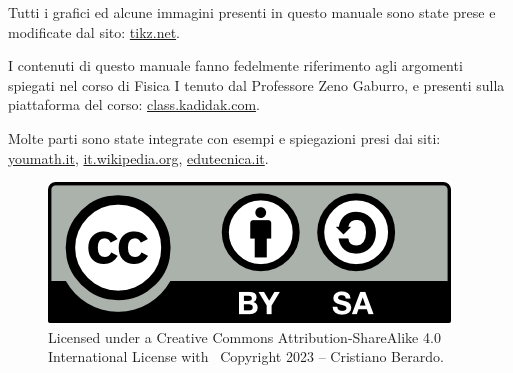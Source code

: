 \begin{thebibliography}{9}

Tutti i grafici ed alcune immagini presenti in questo manuale sono state prese e modificate dal sito: \href{https://tikz.net/}{tikz.net}.

I contenuti di questo manuale fanno fedelmente riferimento agli argomenti spiegati nel corso di Fisica I tenuto dal Professore Zeno Gaburro, e presenti sulla piattaforma del corso: \href{https://class.kadidak.com/}{class.kadidak.com}.

Molte parti sono state integrate con esempi e spiegazioni presi dai siti: \href{https://www.youmath.it/}{youmath.it}, \href{https://it.wikipedia.org/}{it.wikipedia.org}, \href{https://www.edutecnica.it/}{edutecnica.it}.


\begin{figure}[b]
    \centering
    \includegraphics[scale = 0.5]{image/by-sa.png}
    \captionsetup{labelformat=empty}
    \captionsetup{justification=centering}
    \caption{Licensed under a Creative Commons Attribution-ShareAlike 4.0 International License with \textcopyright \, Copyright 2023 – Cristiano Berardo.}
\end{figure}

\end{thebibliography}